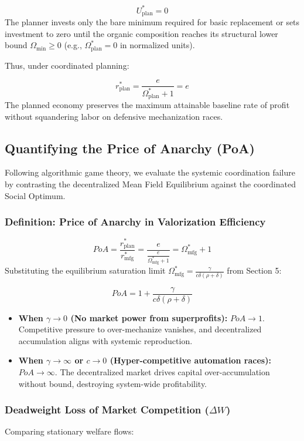 \documentclass[11pt,letterpaper]{report}
\begin{document}
\[
{U}_{\mathrm{plan}}^{*}=0
\]
The planner invests only the bare minimum required for basic replacement or sets investment to zero until the organic composition reaches its structural lower bound ${\Omega }_{\min}\geq 0$ (e.g., ${\Omega }_{\mathrm{plan}}^{*}=0$ in normalized units).

Thus, under coordinated planning:

\[
{r}_{\mathrm{plan}}^{*}=\frac{e}{{\Omega }_{\mathrm{plan}}^{*}+1}=e
\]
The planned economy preserves the maximum attainable baseline rate of profit without squandering labor on defensive mechanization races.

\subsection{Quantifying the Price of Anarchy (PoA)}
Following algorithmic game theory, we evaluate the systemic coordination failure by contrasting the decentralized Mean Field Equilibrium against the coordinated Social Optimum.

\subsubsection{Definition: Price of Anarchy in Valorization Efficiency}
\[
PoA=\frac{{r}_{\mathrm{plan}}^{*}}{{r}_{\mathrm{mfg}}^{*}}=\frac{e}{\frac{e}{{\Omega }_{\mathrm{mfg}}^{*}+1}}={\Omega }_{\mathrm{mfg}}^{*}+1
\]
Substituting the equilibrium saturation limit ${\Omega }_{\mathrm{mfg}}^{*}=\frac{\gamma }{c\delta (\rho +\delta )}$ from Section 5:

\[
PoA=1+\frac{\gamma }{c\delta (\rho +\delta )}
\]
\begin{itemize}
\item \textbf{When $\gamma \rightarrow 0$ (No market power from superprofits):} $PoA\rightarrow 1$. Competitive pressure to over-mechanize vanishes, and decentralized accumulation aligns with systemic reproduction.
\item \textbf{When $\gamma \rightarrow \infty$ or $c\rightarrow 0$ (Hyper-competitive automation races):} $PoA\rightarrow \infty$. The decentralized market drives capital over-accumulation without bound, destroying system-wide profitability.
\end{itemize}
\subsubsection{Deadweight Loss of Market Competition ($\Delta W$)}
Comparing stationary welfare flows:
\end{document}
